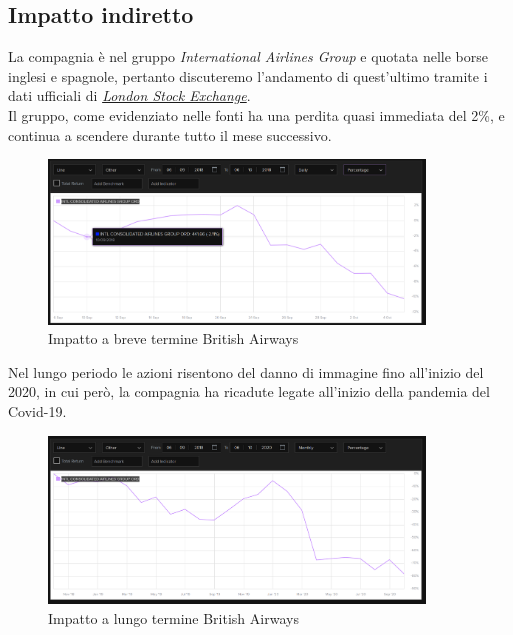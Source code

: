 \documentclass[12pt,a4paper,openright,twoside]{report}
\begin{document}
\subsection{Impatto indiretto}
La compagnia \`e nel gruppo \textit{International Airlines Group} e quotata nelle borse inglesi e spagnole, pertanto discuteremo l'andamento di quest'ultimo tramite i dati ufficiali di \href{https://www.londonstockexchange.com/stock/}{\textit{London Stock Exchange}}.\\
Il gruppo, come evidenziato nelle fonti\cite{BritAir} ha una perdita quasi immediata del 2\%, e continua a scendere durante tutto il mese successivo.

\begin{figure}[H] 
\begin{center} 
\includegraphics[width=10cm]{figures/britAir_short.png} 
\caption[Grafico British Airways short]{Impatto a breve termine British Airways}\label{fig:britair1}
\end{center}
\end{figure}

Nel lungo periodo le azioni risentono del danno di immagine fino all'inizio del 2020, in cui per\`o, la compagnia ha ricadute legate all'inizio della pandemia del Covid-19.\\

\begin{figure}[H] 
\begin{center} 
\includegraphics[width=10cm]{figures/britAir_long.png} 
\caption[Grafico British Airways long]{Impatto a lungo termine  British Airways}\label{fig:fdx2}
\end{center}
\end{figure}
\end{document}
